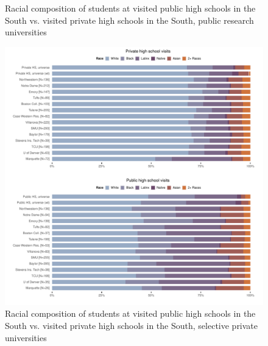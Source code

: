 \documentclass[
  12pt,
]{article}
\begin{document}
\begin{landscape}
\begin{figure}
{}

\caption{Racial composition of students at visited public high schools in the South vs. visited private high schools in the South, public research universities}\label{fig:south-race-comp-pubu-privhs-pubhs}
\end{figure}

\newpage

\begin{figure}

{\centering \includegraphics[width=2\linewidth]{../assets/figures/south_race_comp_privu_privhs_pubhs} 

}

\caption{Racial composition of students at visited public high schools in the South vs. visited private high schools in the South, selective private universities}\label{fig:south-race-comp-privu-privhs-pubhs}
\end{figure}

\end{landscape}

\restoregeometry
\end{document}
